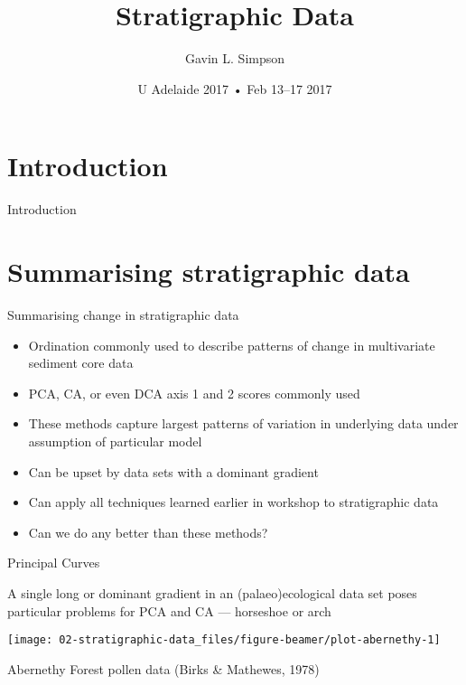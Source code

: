 \documentclass[10pt,ignorenonframetext,compress, aspectratio=169]{beamer}
\title{Stratigraphic Data}
\author{Gavin L. Simpson}
\date{U Adelaide 2017 • Feb 13--17 2017}
\providecommand{\tightlist}{%
  \setlength{\itemsep}{0pt}\setlength{\parskip}{0pt}}
\begin{document}
\frame{\titlepage}

\section{Introduction}\label{introduction}

\begin{frame}{Introduction}

\end{frame}

\section{Summarising stratigraphic
data}\label{summarising-stratigraphic-data}

\begin{frame}{Summarising change in stratigraphic data}

\begin{itemize}
\tightlist
\item
  Ordination commonly used to describe patterns of change in
  multivariate sediment core data
\item
  PCA, CA, or even DCA axis 1 and 2 scores commonly used
\item
  These methods capture largest patterns of variation in underlying data
  under assumption of particular model
\item
  Can be upset by data sets with a dominant gradient
\item
  Can apply all techniques learned earlier in workshop to stratigraphic
  data
\item
  Can we do any better than these methods?
\end{itemize}

\end{frame}

\begin{frame}{Principal Curves}

A single long or dominant gradient in an (palaeo)ecological data set
poses particular problems for PCA and CA --- \alert{horseshoe} or
\alert{arch}

\begin{center}\texttt{[image: 02-stratigraphic-data\_files/figure-beamer/plot-abernethy-1]} \end{center}

Abernethy Forest pollen data (Birks \& Mathewes, 1978)

\end{frame}
\end{document}
